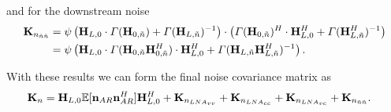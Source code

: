 and for the downstream noise
\begin{align}
\nonumber
\mathbf{K}_{n_{\tilde{n}\tilde{n}}}
&=\psi\left(\mathbf{H}_{L,0}\cdot\Gamma(\mathbf{H}_{0,\tilde{n}})+\Gamma(\mathbf{H}_{L,\tilde{n}})^{-1}\right)\cdot
\left(\Gamma(\mathbf{H}_{0,\tilde{n}})^H\cdot\mathbf{H}_{L,0}^H+\Gamma(\mathbf{H}_{L,\tilde{n}}^H)^{-1}\right)\\
&=\psi\left(\mathbf{H}_{L,0}\cdot\Gamma(\mathbf{H}_{0,\tilde{n}}\mathbf{H}_{0,\tilde{n}}^H)\cdot\mathbf{H}_{L,0}^H + \Gamma(\mathbf{H}_{L,\tilde{n}}\mathbf{H}_{L,\tilde{n}}^H)^{-1}\right).
\end{align}

With these results we can form the final noise covariance matrix as 
\begin{align}
\mat{K}_n&= %
\mat{H}_{L,0}\mathbb{E}[\vec{n}_{AR}\vec{n}_{AR}^H]\mat{H}_{L,0}^H +
\mat{K}_{n_{LNA_{vv}}}+
\mat{K}_{n_{LNA_{cc}}}+
\mat{K}_{n_{LNA_{vc}}}+
\mat{K}_{n_{\tilde{n}\tilde{n}}}.
\end{align}











